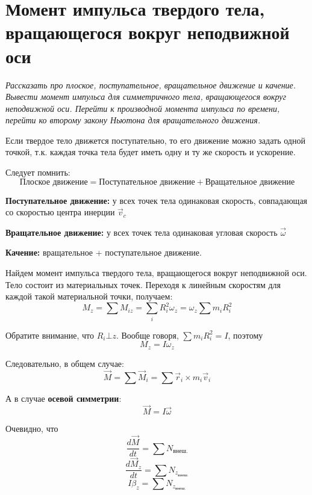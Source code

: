 \documentclass{article}
\begin{document}
    \section{Момент импульса твердого тела, вращающегося вокруг неподвижной оси}
    \par
      \textit{Рассказать про плоское, поступательное, вращательное движение и качение. Вывести момент импульса для симметричного тела, вращающегося вокруг неподвижной оси. Перейти к производной момента импульса по времени, перейти ко второму закону Ньютона для вращательного движения.}\\
    \par 
      Если твердое тело движется поступательно, то его движение можно задать одной точкой, т.к. каждая точка тела будет иметь одну и ту же скорость и ускорение.
    \par
      Следует помнить:
      \begin{equation}
	\text{Плоское движение}=\text{Поступательное движение} + \text{Вращательное движение}
      \end{equation}
    \par
      \textbf{Поступательное движение:} у всех точек тела одинаковая скорость, совпадающая со скоростью центра инерции $\vec v_c$
    \par
      \textbf{Вращательное движение:} у всех точек тела одинаковая угловая скорость $\vec \omega$
    \par
      \textbf{Качение:} вращательное + поступательное движение.
    \par
      Найдем момент импульса твердого тела, вращающегося вокруг неподвижной оси. Тело состоит из материальных точек. Переходя к линейным скоростям для каждой такой материальной точки, получаем:
      \begin{equation}
	M_z=\sum M_{iz}=\sum_iR_i^2\omega_z=\omega_z\sum m_i R_i^2
      \end{equation}
    \par
      Обратите внимание, что $R_i\bot z$. Вообще говоря, $\sum m_iR_i^2=I$, поэтому
      \begin{equation}
	M_z=I\omega_z
      \end{equation}
    \par
      Следовательно, в общем случае:
      \begin{equation}
	\vec M=\sum \vec M_i = \sum \vec r_i\times m_i\vec v_i
      \end{equation}
    \par
      А в случае \textbf{осевой симметрии}:
      \begin{equation}
	\vec M=I\vec \omega
      \end{equation}
    \par
      Очевидно, что
      \begin{equation}
	\frac{d\vec M}{dt}=\sum N_\text{внеш.}
      \end{equation}
      \begin{equation}
	\frac{d\vec M_z}{dt}=\sum N_{z_\text{внеш.}}
      \end{equation}
      \begin{equation}
	I\beta_z=\sum N_{z_\text{внеш.}}
      \end{equation}
  \clearpage
    
\end{document}
